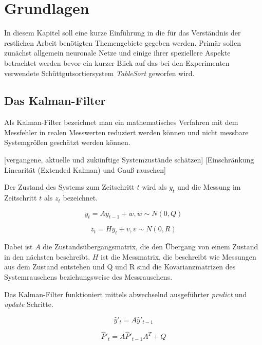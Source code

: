 \chapter{Grundlagen}




In diesem Kapitel soll eine kurze Einführung in die für das Verständnis der restlichen Arbeit benötigten Themengebiete gegeben werden.
Primär sollen zunächst allgemein neuronale Netze und einige ihrer speziellere Aspekte betrachtet werden 
bevor ein kurzer Blick auf das bei den Experimenten verwendete Schüttgutsortiersystem \textit{TableSort} geworfen wird. 

\section{Das Kalman-Filter}
Als Kalman-Filter bezeichnet man ein mathematisches Verfahren mit dem Messfehler in realen Messwerten reduziert werden können und nicht messbare Systemgrößen geschätzt werden können. 


[vergangene, aktuelle und zukünftige Systemzustände schätzen]
[Einschränkung Linearität (Extended Kalman) und Gauß rauschen]

Der Zustand des Systems zum Zeitschritt \(t\) wird als \(y_t\) und die Messung im Zeitschritt \(t\) als \(z_t\) bezeichnet.

\begin{equation}
	y_t = A y_{t-1} + w, 	w \sim N(0, Q)
\end{equation}

\begin{equation}
	z_t = H y_{t} + v, 	v \sim N(0, R)
\end{equation}

Dabei ist \(A\) die Zustandsübergangsmatrix, die den Übergang von einem Zustand in den nächsten beschreibt.
\(H\) ist die Messmatrix, die beschreibt wie Messungen aus dem Zustand entstehen und Q und R sind die Kovarianzmatrizen des Systemrauschens beziehungsweise des Messrauschens. 

Das Kalman-Filter funktioniert mittels abwechselnd ausgeführter \textit{predict} und \textit{update} Schritte.

\begin{equation}
\hat{y}'_t = A \hat{y}'_{t-1}
\end{equation}

\begin{equation}
	\hat{P}'_t = A \hat{P}'_{t-1} A^\textit{T} + Q
\end{equation}





